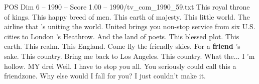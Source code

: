 \begin{textsample}{POS Dim 6 – 1990 – Score 1.00 – 1990/tv\_com\_1990\_59.txt}  \label{ex:f6_pos_073}
This royal throne of kings.
This happy breed of men.
This earth of majesty.
This little world.
The airline that 's uniting the world.
United brings you non-stop service from six U.S. cities to London 's Heathrow.
And the land of poets.
This blessed plot.
This earth.
This realm.
This England.
Come fly the friendly skies.
For a \textbf{friend} 's sake.
This country.
Bring me back to Los Angeles.
This country.
What the...
I 'm hollow.
MY drei Weil.
I have to stop you all.
You seriously could call this a friendzone.
Why else would I fall for you?
I just couldn't make it.

\end{textsample}
